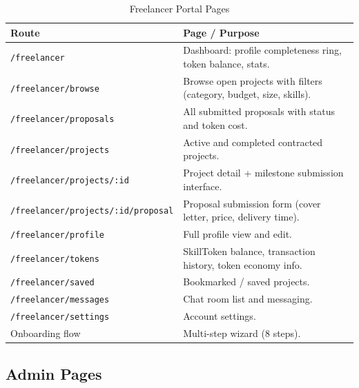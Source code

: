 \begin{table}[H]
\centering
\caption{Freelancer Portal Pages}
\begin{tabularx}{\textwidth}{lX}
\toprule
\textbf{Route} & \textbf{Page / Purpose} \\
\midrule
\texttt{/freelancer}                        & Dashboard: profile completeness ring, token balance, stats. \\
\texttt{/freelancer/browse}                 & Browse open projects with filters (category, budget, size, skills). \\
\texttt{/freelancer/proposals}              & All submitted proposals with status and token cost. \\
\texttt{/freelancer/projects}              & Active and completed contracted projects. \\
\texttt{/freelancer/projects/:id}          & Project detail + milestone submission interface. \\
\texttt{/freelancer/projects/:id/proposal} & Proposal submission form (cover letter, price, delivery time). \\
\texttt{/freelancer/profile}              & Full profile view and edit. \\
\texttt{/freelancer/tokens}               & SkillToken balance, transaction history, token economy info. \\
\texttt{/freelancer/saved}               & Bookmarked / saved projects. \\
\texttt{/freelancer/messages}            & Chat room list and messaging. \\
\texttt{/freelancer/settings}           & Account settings. \\
Onboarding flow                         & Multi-step wizard (8 steps). \\
\bottomrule
\end{tabularx}
\end{table}

\subsection{Admin Pages}

